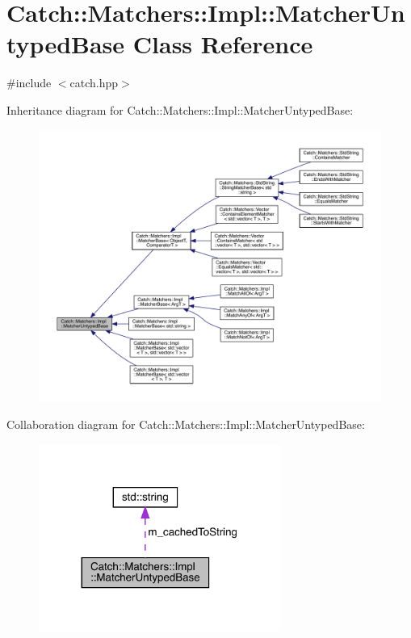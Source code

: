 \hypertarget{class_catch_1_1_matchers_1_1_impl_1_1_matcher_untyped_base}{}\section{Catch\+:\+:Matchers\+:\+:Impl\+:\+:Matcher\+Untyped\+Base Class Reference}
\label{class_catch_1_1_matchers_1_1_impl_1_1_matcher_untyped_base}


{\ttfamily \#include $<$catch.\+hpp$>$}



Inheritance diagram for Catch\+:\+:Matchers\+:\+:Impl\+:\+:Matcher\+Untyped\+Base\+:
\nopagebreak
\begin{figure}[H]
\begin{center}
\leavevmode
\includegraphics[width=350pt]{class_catch_1_1_matchers_1_1_impl_1_1_matcher_untyped_base__inherit__graph}
\end{center}
\end{figure}


Collaboration diagram for Catch\+:\+:Matchers\+:\+:Impl\+:\+:Matcher\+Untyped\+Base\+:
\nopagebreak
\begin{figure}[H]
\begin{center}
\leavevmode
\includegraphics[width=224pt]{class_catch_1_1_matchers_1_1_impl_1_1_matcher_untyped_base__coll__graph}
\end{center}
\end{figure}
